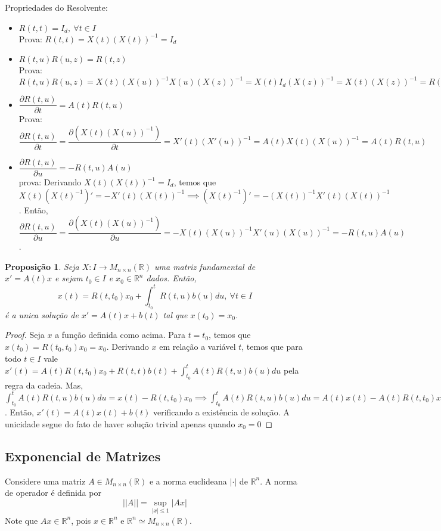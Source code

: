 \documentclass[a4paper, 12pt]{article}
\renewcommand{\Bbb}{\mathbb}
\newtheorem*{7}{Proposição}
\begin{document}
Propriedades do Resolvente:
\begin{itemize}
    \item $R(t,t)= I_d,\ \forall t \in I$\\
    Prova: $R(t,t)=X(t)(X(t))^{-1}=I_d$
    \item $R(t,u)R(u,z) = R(t,z)$\\
    Prova: $R(t,u)R(u,z)=X(t)(X(u))^{-1}X(u)(X(z))^{-1}=X(t)I_d(X(z))^{-1}=X(t)(X(z))^{-1}=R(t,z)$
    \item $\dfrac{\partial R(t,u)}{\partial t} = A(t)R(t,u)$\\
    Prova: $\dfrac{\partial R(t,u)}{\partial t} =\dfrac{\partial (X(t)(X(u))^{-1})}{\partial t}=X'(t)(X'(u))^{-1}=A(t)X(t)(X(u))^{-1}=A(t)R(t,u)$
    \item $\dfrac{\partial R(t,u)}{\partial u} = -R(t,u)A(u)$\\
    prova: Derivando $X(t)(X(t))^{-1}=I_d$, temos que $X(t)(X(t)^{-1})'=-X'(t)(X(t))^{-1} \implies (X(t)^{-1})'=-(X(t))^{-1}X'(t)(X(t))^{-1}$. Então, $\dfrac{\partial R(t,u)}{\partial u} = \dfrac{\partial (X(t)(X(u))^{-1})}{\partial u} = -X(t)(X(u))^{-1}X'(u)(X(u))^{-1}=-R(t,u)A(u)$.
\end{itemize}
\begin{7}
Seja $X:I\to M_{n\times n}(\Bbb R)$ uma matriz fundamental de $x'=A(t)x$ e sejam $t_0 \in I$ e $x_0 \in \Bbb R^n$ dados. Então, $$x(t) = R(t,t_0)x_0 + \int^t_{t_0} R(t,u)b(u)du,\ \forall t \in I$$ é a unica solução de $x' = A(t)x+b(t)$ tal que $x(t_0)=x_0$.
\end{7}
\begin{proof}
Seja $x$ a função definida como acima. Para $t=t_0$, temos que $x(t_0)=R(t_0,t_0)x_0=x_0$. Derivando $x$ em relação a variável $t$, temos que para todo $t\in I$ vale $x'(t)=A(t)R(t,t_0)x_0 + R(t,t)b(t) + \int^t_{t_0} A(t)R(t,u)b(u)du$ pela regra da cadeia. Mas, $\int^t_{t_0} A(t)R(t,u)b(u)du=x(t)-R(t,t_0)x_0 \implies \int^t_{t_0} A(t)R(t,u)b(u)du=A(t)x(t)-A(t)R(t,t_0)x_0$. Então, $x'(t)=A(t)x(t)+b(t)$ verificando a existência de solução. A unicidade segue do fato de haver solução trivial apenas quando $x_0=0$
\end{proof}
\subsection{Exponencial de Matrizes}
Considere uma matriz $A\in M_{n\times n}(\Bbb R)$ e a norma euclideana $|\cdot|$ de $\Bbb R^n$. A norma de operador é definida por $$||A||=\sup_{|x|\leq1}|Ax|$$ 
Note que $Ax \in \Bbb R^n$, pois $x\in \Bbb R^n$ e $\Bbb R^n \simeq M_{n\times n}(\Bbb R)$.
\end{document}
